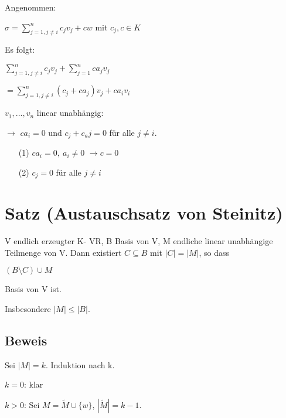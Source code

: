 \documentclass[a4paper, openany]{book}
\begin{document}
    \par \medskip

    \newpage
    Angenommen:

    \begin{center}
       $\sigma = \sum_{j=1, j \neq i}^n c_jv_j + cw$ mit $c_j,c \in K$
    \end{center}

    Es folgt:

    \begin{center}
      $\sum_{j=1, j \neq i}^n c_jv_j + \sum_{j=1}^n ca_jv_j$

      $= \sum_{j=1, j \neq i}^n (c_j +ca_j)v_j + ca_iv_i$
    \end{center}

    $v_1, ..., v_n$ linear unabhängig:

    $\rightarrow$ $ca_i = 0$ und $c_j+c_aj = 0 $ für alle $j \neq i$.

    \begin{enumerate}
      \item[(1)]$ca_i = 0, \ a_i \neq 0$ $\rightarrow c = 0$
      \item[(2)]$c_j = 0$ für alle $j \neq i$
    \end{enumerate}

    \section{Satz (Austauschsatz von Steinitz)}

    V endlich erzeugter K- VR, B Basis von V, M endliche linear unabhängige Teilmenge von V. Dann existiert $C \subseteq B$ mit $|C| = |M|$, so dass                                                             

    \begin{center}
      $(B \setminus C) \cup M$
    \end{center}

    Basis von V ist.

    Insbesondere $|M| \le |B|$.

    \subsection{Beweis}

    Sei $|M| = k$. Induktion nach k.

    $k = 0$: klar

    $k > 0$: Sei $M = \tilde{M} \cup \{w\}$, $|\tilde{M}| = k-1$.
\end{document}
